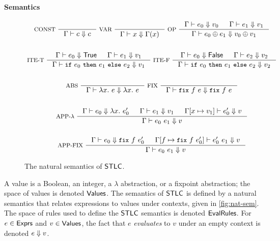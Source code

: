 \paragraph{Semantics}
%
\begin{figure}
  \centering
  \begin{gather*}
  \inference[ CONST ]{ }{ \Gamma \judges c \evalsto c } 
  \inference[ VAR ]{ }{ \Gamma \judges x \evalsto \Gamma(x) }
  \inference[ OP ]{ %
    \Gamma \judges e_0 \evalsto v_0 & %
    \Gamma \judges e_1 \evalsto v_1 } %
  { \Gamma \judges e_0 \oplus e_1 \evalsto v_0 \oplus v_1 } \\
  \\
  \inference[ ITE-T ]{ %
    \Gamma \judges e_0 \evalsto \true & %
    \Gamma \judges e_1 \evalsto v_1 } %
  { \Gamma \judges \ite{ e_0 }{ e_1 }{ e_2 } \evalsto v_1 }
  \inference[ ITE-F ]{ %
    \Gamma \judges e_0 \evalsto \false & %
    \Gamma \judges e_2 \evalsto v_2 } %
  { \Gamma \judges \ite{ e_0 }{ e_1 }{ e_2 } \evalsto v_2 } \\
  \\
  \inference[ ABS ]{ } %
  { \Gamma \judges \lambda x.\ e \evalsto \lambda x.\ e }
  \inference[ FIX ]{ } %
  { \Gamma \judges \fix{ f }{ e } \evalsto \fix{ f }{ e } } \\
  \\
  \inference[ APP-$\lambda$ ]{ %
    \Gamma \judges e_0 \evalsto \lambda x.\ e_0' & %
    \Gamma \judges e_1 \evalsto v_1 & %
    \upd{\Gamma}{x}{v_1} \judges e_0' \evalsto v }
  { \Gamma \judges e_0\ e_1 \evalsto v } \\
  \\
  \inference[ APP-FIX ]{ %
    \Gamma \judges e_0 \evalsto \fix{ f }{ e_0' } & %
    \upd{ \Gamma }{ f }{ \fix{ f }{ e_0' } } \judges %
    e_0'\ e_1 \evalsto v }
  { \Gamma \judges e_0\ e_1 \evalsto v } 
  \end{gather*}
  \caption{The natural semantics of $\mathsf{STLC}$.}
  \label{fig:nat-sem}
\end{figure}
%
A value is a Boolean, an integer, a $\lambda$ abstraction, or a
fixpoint abstraction;
%
the space of values is denoted $\mathsf{Values}$.
%
The semantics of $\mathsf{STLC}$ is defined by a natural semantics that
relates expressions to values under contexts, given in
\autoref{fig:nat-sem}.
%
The space of rules used to define the $\mathsf{STLC}$ semantics is denoted
$\mathsf{EvalRules}$.
%
For $e \in \mathsf{Exprs}$ and $v \in \mathsf{Values}$, the fact that $e$
\emph{evaluates} to $v$ under an empty context is denoted $e \Downarrow
v$.


